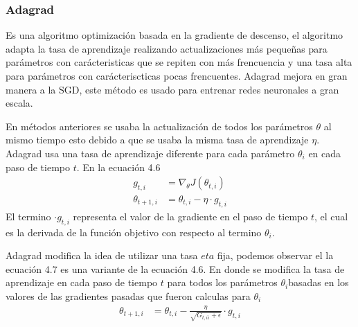 \subsubsection{Adagrad}
Es una algoritmo optimización basada en la gradiente de descenso, el algoritmo adapta la tasa de aprendizaje  realizando actualizaciones más pequeñas para parámetros con carácteristicas que se repiten con más frencuencia y una tasa alta  para parámetros con carácteriscticas pocas frencuentes. Adagrad mejora en gran manera a la SGD, este método es usado para entrenar redes neuronales a gran escala. 

En métodos anteriores se usaba la actualización de todos los parámetros $\theta$ al mismo tiempo esto debido a que se usaba la misma tasa de aprendizaje $\eta $. Adagrad usa una tasa de aprendizaje diferente para cada parámetro $\theta_{i}$ en cada paso de tiempo $t$.
En la ecuación 4.6 
\begin{equation}
\label{adagrad1}
\begin{aligned}
g_{t,i}&=\nabla_{\theta} J(\theta_{t,i})\\
\theta_{t+1,i} &= \theta_{t,i} -\eta \cdot g_{t,i}
\end{aligned}
\end{equation}
El termino $\cdot g_{t,i}$ representa el valor de la gradiente en el paso de tiempo $t$, el cual es la derivada de la función objetivo con respecto al termino $\theta_{i}$.

Adagrad modifica la idea de utilizar una tasa $eta$ fija, podemos observar el la ecuación 4.7 es una variante de la ecuación 4.6. En donde se modifica la tasa de aprendizaje en cada paso de tiempo $t$ para todos los parámetros $\theta_{i} $basadas en los valores de las gradientes pasadas que fueron calculas para $\theta_{i}$
\begin{equation}
\label{adagrad2}
\begin{aligned}
\theta_{t+1,i} &= \theta_{t,i} - \frac{\eta}{\sqrt{G_{t,ii}+\epsilon}} \cdot g_{t,i}
\end{aligned}
\end{equation}

